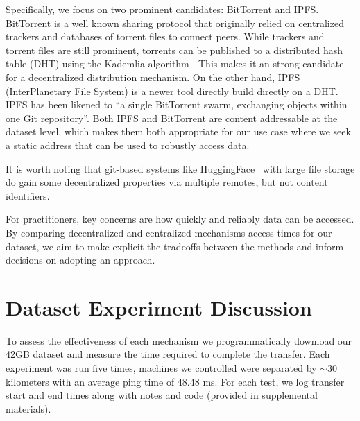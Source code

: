 Specifically, we focus on two prominent candidates:
BitTorrent and IPFS.
BitTorrent \cite{cohen_incentives_2003, cohen_bittorrent_2017} is a well known sharing protocol that
  originally relied on centralized trackers and databases of torrent files to connect peers.
While trackers and torrent files are still prominent, torrents can be published to a distributed hash table
  (DHT) using the Kademlia algorithm \cite{maymounkov_kademlia_2002}.
This makes it an strong candidate for a decentralized distribution mechanism.
On the other hand, IPFS (InterPlanetary File System) \cite{benet_ipfs_2014, bieri_overview_2021} is a newer
  tool directly build directly on a DHT.
IPFS has been likened to ``a single BitTorrent swarm, exchanging objects within one Git repository''.
Both IPFS and BitTorrent are content addressable at the dataset level, which makes them both appropriate for
  our use case where we seek a static address that can be used to robustly access data.

It is worth noting that git-based \cite{chacon2014progit} systems like
  HuggingFace~\cite{huggingface_datasets} with large file storage do gain some decentralized
  properties via multiple remotes, but not content identifiers.

For practitioners, key concerns are how quickly and reliably data can be accessed.
By comparing decentralized and centralized mechanisms access times for our dataset, we aim to make
  explicit the tradeoffs between the methods and inform decisions on adopting an approach.


 
\section{Dataset Experiment Discussion}
\label{sec:datset_discuss}

To assess the effectiveness of each mechanism we programmatically download our 42GB dataset and measure the
  time required to complete the transfer.
Each experiment was run five times, machines we controlled were separated by $\sim\!30$ kilometers with an
  average ping time of 48.48 ms.
For each test, we log transfer start and end times along with notes and code (provided in supplemental
  materials).

